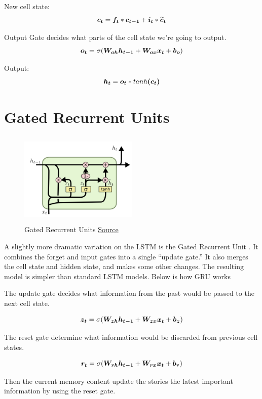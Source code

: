 New cell state:
\[\vect{c_t} = \vect{f_t}*\vect{c_{t-1}} + \vect{i_t}*\vect{\widetilde{c}_t}\]

Output Gate decides what parts of the cell state we’re going to output.
\[\vect{o_t} = \sigma(\matr{W_{oh}}\vect{h_{t-1}} + \matr{W_{ox}}\vect{x_t} + \vect{b_o})\]

Output:
\[\vect{h_t} = \vect{o_t}*tanh\vect{(c_t)}\]

\section{Gated Recurrent Units}

\begin{figure}[h]
  \centering
      \includegraphics[width=0.5\textwidth,height=4.5cm]{figs/GRU.png}
          \caption{
            Gated Recurrent Units
            \href{http://colah.github.io/posts/2015-08-Understanding-LSTMs/}{Source}
          }
          \label{fig:gru}
\end{figure}

A slightly more dramatic variation on the LSTM is the Gated Recurrent Unit \cite{1406.1078}.
It combines the forget and input gates into a single “update gate.” 
It also merges the cell state and hidden state, and makes some other changes. 
The resulting model is simpler than standard LSTM models.
Below is how GRU works

The update gate decides what information from the past would be passed to the next cell state.

\[\vect{z_t} = \sigma(\matr{W_{zh}}\vect{h_{t-1}}+\matr{W_{zx}}\vect{x_t} + \vect{b_z}) \]

The reset gate determine what information would be discarded from previous cell states.

\[\vect{r_t} = \sigma(\matr{W_{rh}}\vect{h_{t-1}}+\matr{W_{rx}}\vect{x_t} + \vect{b_r}) \]

Then the current memory content update the stories the latest important information by using the reset gate.

